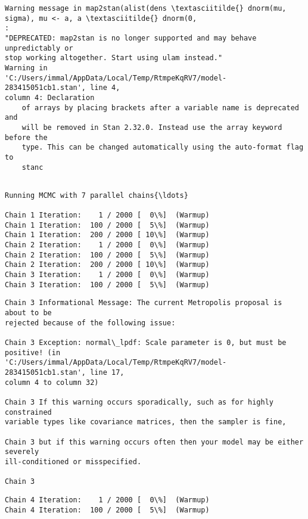 \documentclass[11pt]{article}
\begin{document}
    \begin{Verbatim}[commandchars=\\\{\}]
Warning message in map2stan(alist(dens \textasciitilde{} dnorm(mu, sigma), mu <- a, a \textasciitilde{} dnorm(0,
:
"DEPRECATED: map2stan is no longer supported and may behave unpredictably or
stop working altogether. Start using ulam instead."
Warning in
'C:/Users/immal/AppData/Local/Temp/RtmpeKqRV7/model-283415051cb1.stan', line 4,
column 4: Declaration
    of arrays by placing brackets after a variable name is deprecated and
    will be removed in Stan 2.32.0. Instead use the array keyword before the
    type. This can be changed automatically using the auto-format flag to
    stanc


    \end{Verbatim}

    \begin{Verbatim}[commandchars=\\\{\}]
Running MCMC with 7 parallel chains{\ldots}

Chain 1 Iteration:    1 / 2000 [  0\%]  (Warmup)
Chain 1 Iteration:  100 / 2000 [  5\%]  (Warmup)
Chain 1 Iteration:  200 / 2000 [ 10\%]  (Warmup)
Chain 2 Iteration:    1 / 2000 [  0\%]  (Warmup)
Chain 2 Iteration:  100 / 2000 [  5\%]  (Warmup)
Chain 2 Iteration:  200 / 2000 [ 10\%]  (Warmup)
Chain 3 Iteration:    1 / 2000 [  0\%]  (Warmup)
Chain 3 Iteration:  100 / 2000 [  5\%]  (Warmup)
    \end{Verbatim}

    \begin{Verbatim}[commandchars=\\\{\}]
Chain 3 Informational Message: The current Metropolis proposal is about to be
rejected because of the following issue:

Chain 3 Exception: normal\_lpdf: Scale parameter is 0, but must be positive! (in
'C:/Users/immal/AppData/Local/Temp/RtmpeKqRV7/model-283415051cb1.stan', line 17,
column 4 to column 32)

Chain 3 If this warning occurs sporadically, such as for highly constrained
variable types like covariance matrices, then the sampler is fine,

Chain 3 but if this warning occurs often then your model may be either severely
ill-conditioned or misspecified.

Chain 3

    \end{Verbatim}

    \begin{Verbatim}[commandchars=\\\{\}]
Chain 4 Iteration:    1 / 2000 [  0\%]  (Warmup)
Chain 4 Iteration:  100 / 2000 [  5\%]  (Warmup)
    \end{Verbatim}
\end{document}
